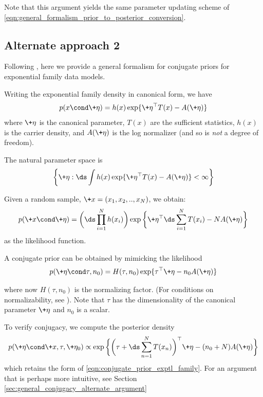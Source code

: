 \documentclass{article} %
\newcommand{\carrierDensity}{h}
\newcommand{\naturalParam}{\+\eta}
\begin{document}


Note that this argument yields the same parameter updating scheme of \eqref{eqn:general_formalism_prior_to_posterior_conversion}.


\subsection{Alternate approach 2} \label{sec:ef_general_formalism_jordan}

Following \cite{jordan2010conjugate}, here we provide a general formalism for conjugate priors for exponential family data models. 

Writing the exponential family density in canonical form, we have
\[ p(x \cond \naturalParam) = \carrierDensity(x) \exp \{ \naturalParam^\top T(x) - A(\naturalParam) \} \]
where $\naturalParam$ is the canonical parameter, $T(x)$ are the sufficient statistics,  $\carrierDensity(x)$ is the carrier density, and $A(\naturalParam)$ is the log normalizer (and so is \textit{not} a degree of freedom). 

The natural parameter space is 
\[  \bigg\{\naturalParam : \ds\int \carrierDensity(x) \exp \{ \naturalParam^\top T(x) - A(\naturalParam) \} < \infty \bigg \}\]

Given a random sample, $\+x=(x_1, x_2, .., x_N)$, we obtain:
\[ p(\+x \cond \naturalParam) = \bigg( \ds\prod_{i=1}^N \carrierDensity(x_i)  \bigg) \exp \bigg\{ \naturalParam^\top  \ds\sum_{i=1}^N T(x_i) - N A(\naturalParam) \bigg\} \]
as the likelihood function.

A conjugate prior can be obtained by mimicking the likelihood
\begin{equation}
p (\naturalParam \cond \tau, n_0) = H(\tau, n_0) \exp \{ \tau^\top \naturalParam - n_0 A(\naturalParam)\}
\label{eqn:conjugate_prior_exptl_family}
\end{equation}

where now $H(\tau, n_0)$ is the normalizing factor.  (For conditions on normalizability, see \cite{jordan2010conjugate}).   Note that $\tau$ has the dimensionality of the canonical parameter $\naturalParam$ and $n_0$ is a scalar.

To verify conjugacy, we compute the posterior density
\[ p (\naturalParam \cond \+x, \tau, \naturalParam_0)  \propto \exp \bigg\{ \bigg( \tau + \ds\sum_{n=1}^N  T(x_n) \bigg)^\top \naturalParam - (n_0 + N) A(\naturalParam) \bigg\} \]
which retains the form of \eqref{eqn:conjugate_prior_exptl_family}.  For an argument that is perhaps more intuitive, see Section \ref{sec:general_conjugacy_alternate_argument} 
\end{document}
